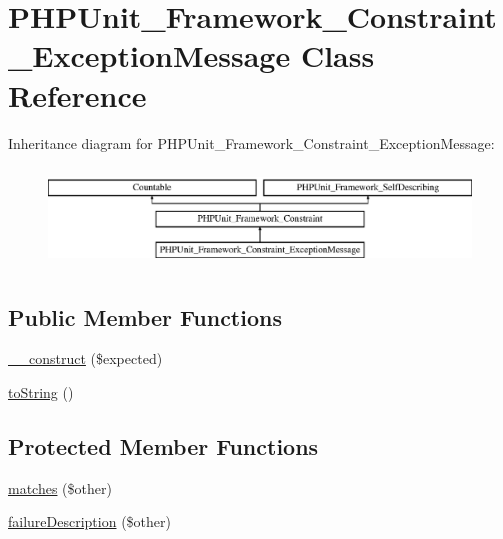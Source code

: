 \hypertarget{class_p_h_p_unit___framework___constraint___exception_message}{}\section{P\+H\+P\+Unit\+\_\+\+Framework\+\_\+\+Constraint\+\_\+\+Exception\+Message Class Reference}
\label{class_p_h_p_unit___framework___constraint___exception_message}
Inheritance diagram for P\+H\+P\+Unit\+\_\+\+Framework\+\_\+\+Constraint\+\_\+\+Exception\+Message\+:\begin{figure}[H]
\begin{center}
\leavevmode
\includegraphics[height=2.683706cm]{class_p_h_p_unit___framework___constraint___exception_message}
\end{center}
\end{figure}
\subsection*{Public Member Functions}
\begin{DoxyCompactItemize}
\item 
\mbox{\hyperlink{class_p_h_p_unit___framework___constraint___exception_message_a4432014bcb5b5900d382abfaa34d4a31}{\+\_\+\+\_\+construct}} (\$expected)
\item 
\mbox{\hyperlink{class_p_h_p_unit___framework___constraint___exception_message_a5558c5d549f41597377fa1ea8a1cefa3}{to\+String}} ()
\end{DoxyCompactItemize}
\subsection*{Protected Member Functions}
\begin{DoxyCompactItemize}
\item 
\mbox{\hyperlink{class_p_h_p_unit___framework___constraint___exception_message_a9c9c337de483bbdbb9fa249a6c7c9cc5}{matches}} (\$other)
\item 
\mbox{\hyperlink{class_p_h_p_unit___framework___constraint___exception_message_aaabb679273bfb812df4d81c283754a59}{failure\+Description}} (\$other)
\end{DoxyCompactItemize}
